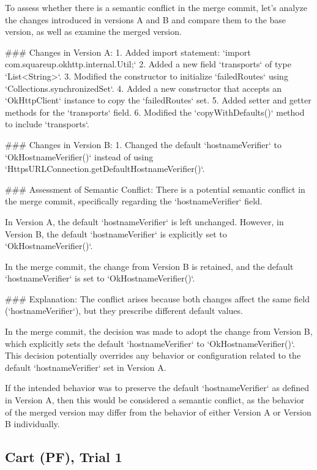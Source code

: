 \begin{response}
  To assess whether there is a semantic conflict in the merge commit, let's analyze the changes introduced in versions A and B and compare them to the base version, as well as examine the merged version.

  ### Changes in Version A:
  1. Added import statement: `import com.squareup.okhttp.internal.Util;`
  2. Added a new field `transports` of type `List<String>`.
  3. Modified the constructor to initialize `failedRoutes` using `Collections.synchronizedSet`.
  4. Added a new constructor that accepts an `OkHttpClient` instance to copy the `failedRoutes` set.
  5. Added setter and getter methods for the `transports` field.
  6. Modified the `copyWithDefaults()` method to include `transports`.
  
  ### Changes in Version B:
  1. Changed the default `hostnameVerifier` to `OkHostnameVerifier()` instead of using `HttpsURLConnection.getDefaultHostnameVerifier()`.
  
  ### Assessment of Semantic Conflict:
  There is a potential semantic conflict in the merge commit, specifically regarding the `hostnameVerifier` field.
  
  In Version A, the default `hostnameVerifier` is left unchanged. However, in Version B, the default `hostnameVerifier` is explicitly set to `OkHostnameVerifier()`.
  
  In the merge commit, the change from Version B is retained, and the default `hostnameVerifier` is set to `OkHostnameVerifier()`.
  
  ### Explanation:
  The conflict arises because both changes affect the same field (`hostnameVerifier`), but they prescribe different default values.
  
  In the merge commit, the decision was made to adopt the change from Version B, which explicitly sets the default `hostnameVerifier` to `OkHostnameVerifier()`. This decision potentially overrides any behavior or configuration related to the default `hostnameVerifier` set in Version A.
  
  If the intended behavior was to preserve the default `hostnameVerifier` as defined in Version A, then this would be considered a semantic conflict, as the behavior of the merged version may differ from the behavior of either Version A or Version B individually.
\end{response}

\subsection{Cart (PF), Trial 1}

